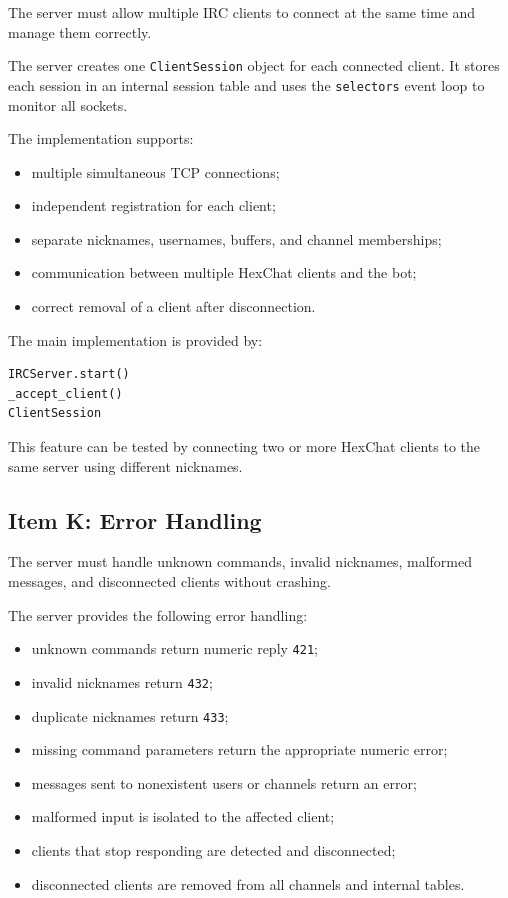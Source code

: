 \documentclass[a4paper,12pt]{article}
\begin{document}
The server must allow multiple IRC clients to connect at the same time and manage them correctly.

The server creates one \texttt{ClientSession} object for each connected client. It stores each session in an internal session table and uses the \texttt{selectors} event loop to monitor all sockets.

The implementation supports:

\begin{itemize}
    \item multiple simultaneous TCP connections;
    \item independent registration for each client;
    \item separate nicknames, usernames, buffers, and channel memberships;
    \item communication between multiple HexChat clients and the bot;
    \item correct removal of a client after disconnection.
\end{itemize}

The main implementation is provided by:

\begin{lstlisting}[language=Python]
IRCServer.start()
_accept_client()
ClientSession
\end{lstlisting}

This feature can be tested by connecting two or more HexChat clients to the same server using different nicknames.

\subsection{Item K: Error Handling}

The server must handle unknown commands, invalid nicknames, malformed messages, and disconnected clients without crashing.

The server provides the following error handling:

\begin{itemize}
    \item unknown commands return numeric reply \texttt{421};
    \item invalid nicknames return \texttt{432};
    \item duplicate nicknames return \texttt{433};
    \item missing command parameters return the appropriate numeric error;
    \item messages sent to nonexistent users or channels return an error;
    \item malformed input is isolated to the affected client;
    \item clients that stop responding are detected and disconnected;
    \item disconnected clients are removed from all channels and internal tables.
\end{itemize}
\end{document}
